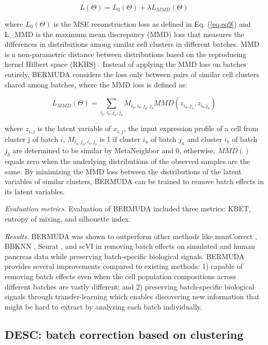 \documentclass[
]{book}
\begin{document}
\begin{equation}
L(\Theta) = L_{0}(\Theta) + \lambda L_{MMD}(\Theta) \label{eq:equ17}
\end{equation}

where \(L_{0}(\Theta)\) is the MSE reconstruction loss as defined in Eq. (\eqref{eq:eq9}) and L\_MMD is the maximum mean discrepancy (MMD) loss that measures the differences in distributions among similar cell clusters in different batches. MMD is a non-parametric distance between distributions based on the reproducing kernel Hilbert space (RKHS) \citep{RN185}. Instead of applying the MMD loss on batches entirely, BERMUDA considers the loss only between pairs of similar cell clusters shared among batches, where the MMD loss is defined as:

\begin{equation}
L_{MMD}(\Theta) = \sum_{i_{a},i_{b},j_{a},j_{b}}M_{i_{a},i_{b},j_{a},j_{b}}MMD(z_{i_{a},j_{a}},z_{i_{b}.j_{b}}) \label{eq:equ18}
\end{equation}

where \(z_{i,j}\) is the latent variable of \(x_{i,j}\), the input expression profile of a cell from cluster j of batch \(i\), \(M_{i_{a},j_{a},i_{b},j_{b}}\) is 1 if cluster \(i_{a}\) of batch \(j_{a}\) and cluster \(i_{b}\) of batch \(j_{b}\) are determined to be similar by MetaNeighbor \citep{RN186} and 0, otherwise. \(MMD()\) equals zero when the underlying distributions of the observed samples are the same. By minimizing the MMD loss between the distributions of the latent variables of similar clusters, BERMUDA can be trained to remove batch effects in its latent variables.

\emph{Evaluation metrics.} Evaluation of BERMUDA included three metrics: KBET, entropy of mixing, and silhouette index.

\emph{Results.} BERMUDA was shown to outperform other methods like mnnCorrect \citep{RN84}, BBKNN \citep{RN115}, Seurat \citep{RN96}, and scVI \citep{RN88} in removing batch effects on simulated and human pancreas data while preserving batch-specific biological signals. BERMUDA provides several improvements compared to existing methods: 1) capable of removing batch effects even when the cell population compositions across different batches are vastly different; and 2) preserving batch-specific biological signals through transfer-learning which enables discovering new information that might be hard to extract by analyzing each batch individually.

\hypertarget{ch-5-2-2}{%
\subsection{DESC: batch correction based on clustering}\label{ch-5-2-2}}
\end{document}
